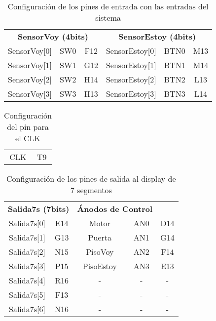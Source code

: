 
	\begin{table}[H]
    \centering
		\begin{tabular}{|c|c|c||c|c|c|}
			\hline
			\rowcolor[rgb]{0.21,0.69,0.87}\multicolumn{6}{|c|}{  \textbf{ {Configuración Pines de entrada}}} \\
			\hline \hline
			\multicolumn{3}{|c|}{  \textbf{ {SensorVoy (4bits)}}} & \multicolumn{3}{|c|}{\textbf{SensorEstoy (4bits)}} \\
			\hline
			SensorVoy[0] & SW0 & F12 & SensorEstoy[0] & BTN0 & M13 \\
			\hline
			SensorVoy[1] & SW1 & G12 & SensorEstoy[1] & BTN1 & M14 \\
			\hline
			SensorVoy[2] & SW2 & H14 & SensorEstoy[2] & BTN2 & L13 \\
			\hline
			SensorVoy[3] & SW3 & H13 & SensorEstoy[3] & BTN3 & L14 \\
			\hline
		\end{tabular}
		\caption{ Configuración de los pines de entrada con las entradas del sistema }
		\label{tab:pinEntradas}
	\end{table}

	\begin{table}[H]
    \centering
		\begin{tabular}{|c|c|}
			\hline
			\rowcolor[rgb]{0.21,0.69,0.87}\multicolumn{2}{|c|}{  \textbf{ {Configuración pin CLK}}} \\
			\hline \hline
			CLK & T9 \\ 
			\hline
		\end{tabular}
		\caption{ Configuración del pin para el CLK }
		\label{tab:pinCLK}
	\end{table}

	\begin{table}[H]
    \centering
		\begin{tabular}{|c|c||c|c|c|}
			\hline
			\rowcolor[rgb]{0.21,0.69,0.87}\multicolumn{4}{|c|}{  \textbf{ {Configuración Pines de los displays de 7 segmentos}}} \\
			\hline \hline
			\multicolumn{2}{|c|}{  \textbf{ { Salida7s (7bits)}}} & \multicolumn{2}{|c|}{\textbf{Ánodos de Control}} \\
			\hline
			Salida7s[0] & E14 & Motor & AN0 & D14 \\
			\hline
			Salida7s[1] & G13 & Puerta & AN1 & G14 \\
			\hline
			Salida7s[2] & N15 & PisoVoy & AN2 & F14 \\
			\hline
			Salida7s[3] & P15 & PisoEstoy & AN3 & E13 \\
			\hline
			Salida7s[4] & R16 & - & - & - \\
			\hline
			Salida7s[5] & F13 & - & - & - \\
			\hline
			Salida7s[6] & N16 & - & - & - \\
			\hline
		\end{tabular}
		\caption{ Configuración de los pines de salida al display de 7 segmentos }
		\label{tab:pin7s}
	\end{table}
	


